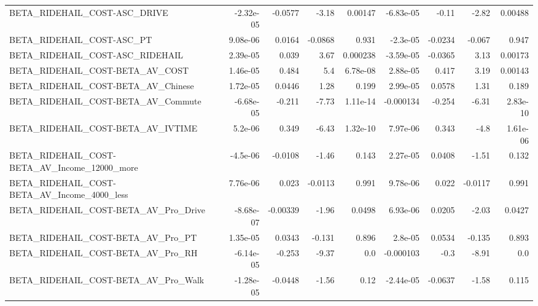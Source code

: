 \begin{tabular}{lrrrrrrrr}
BETA\_RIDEHAIL\_COST-ASC\_DRIVE                       &   -2.32e-05 &      -0.0577 &     -3.18 &  0.00147 &  -6.83e-05 &       -0.11 &        -2.82 &       0.00488 \\
BETA\_RIDEHAIL\_COST-ASC\_PT                          &    9.08e-06 &       0.0164 &   -0.0868 &    0.931 &   -2.3e-05 &     -0.0234 &       -0.067 &         0.947 \\
BETA\_RIDEHAIL\_COST-ASC\_RIDEHAIL                    &    2.39e-05 &        0.039 &      3.67 & 0.000238 &  -3.59e-05 &     -0.0365 &         3.13 &       0.00173 \\
BETA\_RIDEHAIL\_COST-BETA\_AV\_COST                    &    1.46e-05 &        0.484 &       5.4 & 6.78e-08 &   2.88e-05 &       0.417 &         3.19 &       0.00143 \\
BETA\_RIDEHAIL\_COST-BETA\_AV\_Chinese                 &    1.72e-05 &       0.0446 &      1.28 &    0.199 &   2.99e-05 &      0.0578 &         1.31 &         0.189 \\
BETA\_RIDEHAIL\_COST-BETA\_AV\_Commute                 &   -6.68e-05 &       -0.211 &     -7.73 & 1.11e-14 &  -0.000134 &      -0.254 &        -6.31 &      2.83e-10 \\
BETA\_RIDEHAIL\_COST-BETA\_AV\_IVTIME                  &     5.2e-06 &        0.349 &     -6.43 & 1.32e-10 &   7.97e-06 &       0.343 &         -4.8 &      1.61e-06 \\
BETA\_RIDEHAIL\_COST-BETA\_AV\_Income\_12000\_more       &    -4.5e-06 &      -0.0108 &     -1.46 &    0.143 &   2.27e-05 &      0.0408 &        -1.51 &         0.132 \\
BETA\_RIDEHAIL\_COST-BETA\_AV\_Income\_4000\_less        &    7.76e-06 &        0.023 &   -0.0113 &    0.991 &   9.78e-06 &       0.022 &      -0.0117 &         0.991 \\
BETA\_RIDEHAIL\_COST-BETA\_AV\_Pro\_Drive               &   -8.68e-07 &     -0.00339 &     -1.96 &   0.0498 &   6.93e-06 &      0.0205 &        -2.03 &        0.0427 \\
BETA\_RIDEHAIL\_COST-BETA\_AV\_Pro\_PT                  &    1.35e-05 &       0.0343 &    -0.131 &    0.896 &    2.8e-05 &      0.0534 &       -0.135 &         0.893 \\
BETA\_RIDEHAIL\_COST-BETA\_AV\_Pro\_RH                  &   -6.14e-05 &       -0.253 &     -9.37 &      0.0 &  -0.000103 &        -0.3 &        -8.91 &           0.0 \\
BETA\_RIDEHAIL\_COST-BETA\_AV\_Pro\_Walk                &   -1.28e-05 &      -0.0448 &     -1.56 &     0.12 &  -2.44e-05 &     -0.0637 &        -1.58 &         0.115 \\

\end{tabular}

